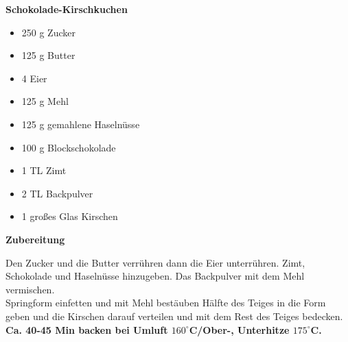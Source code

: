 
\parindent0pt	

\pagestyle{empty}


\textbf{{\LARGE Schokolade-Kirschkuchen}}%


\hrulefill
\vspace*{\fill}
\begin{multicols}{2}	


\begin{itemize}
\item 250 g Zucker
\item 125 g Butter
\item 4 Eier
\item 125 g Mehl
\item 125 g gemahlene Haselnüsse
\item 100 g Blockschokolade
\item 1 TL Zimt
\item 2 TL Backpulver
\item 1 großes Glas Kirschen
\end{itemize}

\end{multicols}
\vfill
\newpage
\textbf{{\LARGE Zubereitung}}%

\hrulefill

\vspace*{\fill}
\begin{multicols}{2}


Den Zucker und die Butter verrühren dann die Eier unterrühren.
Zimt, Schokolade und Haselnüsse hinzugeben.
Das Backpulver mit dem Mehl vermischen.\\

Springform einfetten und mit Mehl bestäuben
Hälfte des Teiges in die Form geben und die
Kirschen darauf verteilen und mit dem Rest des Teiges bedecken.
\textbf{Ca. 40-45 Min backen bei Umluft $160^\circ$C/Ober-, Unterhitze $175^\circ$C.}



\end{multicols}
\vfill
